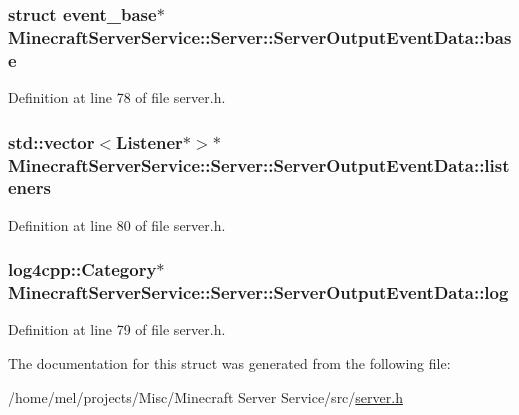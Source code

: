 \subsubsection[{\texorpdfstring{base}{base}}]{\setlength{\rightskip}{0pt plus 5cm}struct event\+\_\+base$\ast$ Minecraft\+Server\+Service\+::\+Server\+::\+Server\+Output\+Event\+Data\+::base}\hypertarget{struct_minecraft_server_service_1_1_server_1_1_server_output_event_data_a0c622aed801f6df81751e94a0f962c28}{}\label{struct_minecraft_server_service_1_1_server_1_1_server_output_event_data_a0c622aed801f6df81751e94a0f962c28}


Definition at line 78 of file server.\+h.

\subsubsection[{\texorpdfstring{listeners}{listeners}}]{\setlength{\rightskip}{0pt plus 5cm}std\+::vector$<${\bf Listener}$\ast$$>$$\ast$ Minecraft\+Server\+Service\+::\+Server\+::\+Server\+Output\+Event\+Data\+::listeners}\hypertarget{struct_minecraft_server_service_1_1_server_1_1_server_output_event_data_a761ef24355fe5f38b8aac5dea973c76a}{}\label{struct_minecraft_server_service_1_1_server_1_1_server_output_event_data_a761ef24355fe5f38b8aac5dea973c76a}


Definition at line 80 of file server.\+h.

\subsubsection[{\texorpdfstring{log}{log}}]{\setlength{\rightskip}{0pt plus 5cm}log4cpp\+::\+Category$\ast$ Minecraft\+Server\+Service\+::\+Server\+::\+Server\+Output\+Event\+Data\+::log}\hypertarget{struct_minecraft_server_service_1_1_server_1_1_server_output_event_data_a271ef29168235bf1004a7e394acbb282}{}\label{struct_minecraft_server_service_1_1_server_1_1_server_output_event_data_a271ef29168235bf1004a7e394acbb282}


Definition at line 79 of file server.\+h.



The documentation for this struct was generated from the following file\+:\begin{DoxyCompactItemize}
\item 
/home/mel/projects/\+Misc/\+Minecraft Server Service/src/\hyperlink{server_8h}{server.\+h}\end{DoxyCompactItemize}
